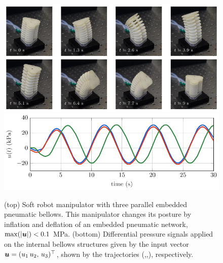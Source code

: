 \begin{figure}[!h]
  \centering
  \includegraphics*[width=\textwidth]{./pdf/thesis-figure-4-1-1.pdf} \\[1.25em]
  \includegraphics*[width=\textwidth]{./pdf/thesis-figure-4-1-2.pdf}
   \caption{\small (top) Soft robot manipulator with three parallel embedded pneumatic bellows. This manipulator changes its posture by inflation and deflation of an embedded pneumatic network, $\max(\lvert {\boldsymbol{u}} \rvert)<0.1$ \si{\mega \pascal}. (bottom) Differential pressure signals applied on the internal bellows structures given by the input vector ${\boldsymbol{u}} = (u_1\,u_2,\,u_3)^\top$, shown by the trajectories (,,), respectively.}
   \vspace{-0.1cm}
   \label{fig:C2:soft_robot}
 \end{figure}
 
